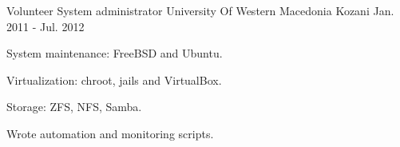 


\begin{cventries}


\cventry
{Volunteer System administrator} %
{University Of Western Macedonia} %
{Kozani} %
{Jan. 2011 - Jul. 2012} %
{ %
\begin{cvitems}
\item {System maintenance: FreeBSD and Ubuntu.}
\item {Virtualization: chroot, jails and VirtualBox.}
\item {Storage: ZFS, NFS, Samba.}
\item {Wrote automation and monitoring scripts.}
\end{cvitems}
}


\end{cventries}
